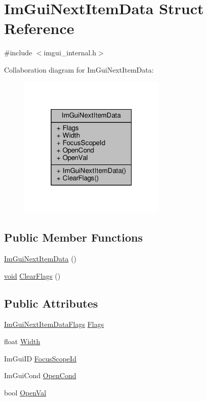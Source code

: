 \hypertarget{structImGuiNextItemData}{}\section{Im\+Gui\+Next\+Item\+Data Struct Reference}
\label{structImGuiNextItemData}


{\ttfamily \#include $<$imgui\+\_\+internal.\+h$>$}



Collaboration diagram for Im\+Gui\+Next\+Item\+Data\+:
\nopagebreak
\begin{figure}[H]
\begin{center}
\leavevmode
\includegraphics[width=199pt]{structImGuiNextItemData__coll__graph}
\end{center}
\end{figure}
\subsection*{Public Member Functions}
\begin{DoxyCompactItemize}
\item 
\hyperlink{structImGuiNextItemData_a2226fdff5fce11de421b28f9af4f268a}{Im\+Gui\+Next\+Item\+Data} ()
\item 
\hyperlink{imgui__impl__opengl3__loader_8h_ac668e7cffd9e2e9cfee428b9b2f34fa7}{void} \hyperlink{structImGuiNextItemData_a0159fd0bdffe71c29271a3dbdde9013b}{Clear\+Flags} ()
\end{DoxyCompactItemize}
\subsection*{Public Attributes}
\begin{DoxyCompactItemize}
\item 
\hyperlink{imgui__internal_8h_a24c816e161b249fa062cec22451bd863}{Im\+Gui\+Next\+Item\+Data\+Flags} \hyperlink{structImGuiNextItemData_aa05b7c79d02ab92ff23038cede65265b}{Flags}
\item 
float \hyperlink{structImGuiNextItemData_ab4e2f2f28801cc1d449ccaa105168938}{Width}
\item 
Im\+Gui\+ID \hyperlink{structImGuiNextItemData_a30942426eed492893c157bb155cf9201}{Focus\+Scope\+Id}
\item 
Im\+Gui\+Cond \hyperlink{structImGuiNextItemData_ac9550c80e18abf14a4dffdca9211d719}{Open\+Cond}
\item 
bool \hyperlink{structImGuiNextItemData_a72e212148815fefe93e7a7723d5db97b}{Open\+Val}
\end{DoxyCompactItemize}


